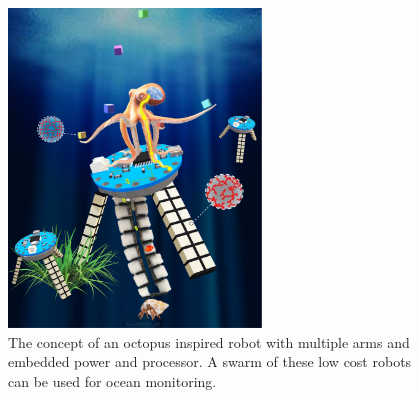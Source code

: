 \begin{figure}[!th]
\centering
\includegraphics[width=0.6\textwidth]{3Doctopus.pdf}
    \caption[]{The concept of an octopus inspired robot with multiple arms and embedded power and processor. A swarm of these low cost robots can be used for ocean monitoring.}
    \label{fig:3Doctopus}
\end{figure}

